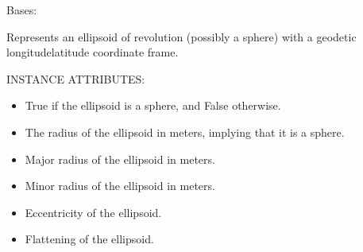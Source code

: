 \documentclass[a4paper,12ptopenany,oneside,english]{sphinxmanual}
\begin{document}
\begin{fulllineitems}
\label{\detokenize{ellipsoids:rhealpixdggs.ellipsoids.Ellipsoid}}
\pysigstartsignatures
{}
\pysigstopsignatures
\sphinxAtStartPar
Bases: 

\sphinxAtStartPar
Represents an ellipsoid of revolution (possibly a sphere) with a
geodetic longitude\sphinxhyphen{}latitude coordinate frame.

\sphinxAtStartPar
INSTANCE ATTRIBUTES:
\begin{itemize}
\item {} 
\sphinxAtStartPar
{} \sphinxhyphen{} True if the ellipsoid is a sphere, and False otherwise.

\item {} 
\sphinxAtStartPar
{} \sphinxhyphen{} The radius of the ellipsoid in meters, implying that it is a
sphere.

\item {} 
\sphinxAtStartPar
{} \sphinxhyphen{} Major radius of the ellipsoid in meters.

\item {} 
\sphinxAtStartPar
{} \sphinxhyphen{} Minor radius of the ellipsoid in meters.

\item {} 
\sphinxAtStartPar
{} \sphinxhyphen{} Eccentricity of the ellipsoid.

\item {} 
\sphinxAtStartPar
{} \sphinxhyphen{} Flattening of the ellipsoid.


\end{itemize}
\end{fulllineitems}
\end{document}
